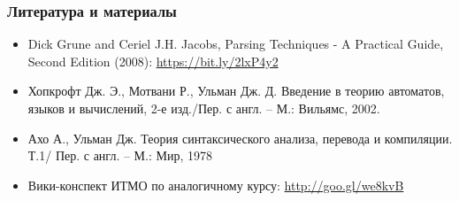 \documentclass{beamer}
\begin{document}
\begin{frame}[fragile]
  \transwipe[direction=90]
  \frametitle{Литература и материалы}
  \begin{itemize}
    \item Dick Grune and Ceriel J.H. Jacobs, Parsing Techniques - A Practical Guide, Second Edition (2008): \url{https://bit.ly/2lxP4y2}
    \item Хопкрофт Дж. Э., Мотвани Р., Ульман Дж. Д. Введение в теорию автоматов, языков и вычислений, 2-е изд./Пер. с англ. – М.: Вильямс, 2002.
    \item Ахо А., Ульман Дж. Теория синтаксического анализа, перевода и компиляции. Т.1/ Пер. с англ. – М.: Мир, 1978
    \item Вики-конспект ИТМО по аналогичному курсу: \url{http://goo.gl/we8kvB}
  \end{itemize}
\end{frame}
\end{document}
